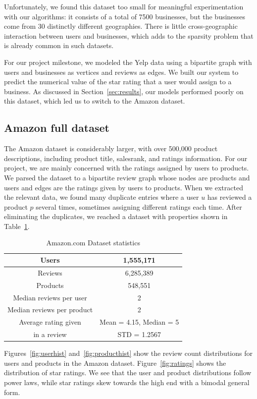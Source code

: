 \documentclass[letterpaper, 11 pt, conference]{ieeeconf}
\begin{document}
Unfortunately, we found this dataset too small for meaningful experimentation 
with our algorithms: it consists of a total of 7500 businesses, but the 
businesses come from 30 distinctly different geographies. There is little
cross-geographic interaction between users and businesses, which adds to the 
sparsity problem that is already common in such datasets. 

For our project milestone, we modeled the Yelp data using a bipartite graph 
with users and businesses as vertices and reviews as edges.
We built our system to predict the numerical value of the star
rating that a user would assign to a business. As discussed in 
Section~\ref{sec:results}, our models performed poorly on this dataset, which 
led us to switch to the Amazon dataset.

\subsection{Amazon full dataset}
The Amazon dataset is considerably larger, with over 
500,000 product descriptions, including product title, salesrank, and ratings 
information. For our project, we are mainly concerned with the ratings assigned 
by users to products. We parsed the dataset to a bipartite review 
graph whose nodes are products and users and edges are the ratings given by 
users to products. When we extracted the relevant data, we found many 
duplicate entries where a user $u$ has reviewed a product $p$ several times, 
sometimes assigning different ratings each time. After eliminating the 
duplicates, we reached a dataset with properties shown in 
Table~\ref{table:amazonstats}.

\begin{table}[htb]
\centering
\begin{tabular}{|c|c|}
\hline
Users &1,555,171 \tabularnewline \hline
Reviews &6,285,389 \tabularnewline \hline
Products &548,551 \tabularnewline \hline
Median reviews per user & 2
\tabularnewline \hline
Median reviews per product & 2
\tabularnewline \hline
Average rating given &Mean = 4.15, Median = 5 \tabularnewline
in a review &STD = 1.2567
\tabularnewline \hline

\end{tabular}
\caption{ Amazon.com Dataset statistics }
\label{table:amazonstats}
\end{table}

Figures~\ref{fig:userhist} and~\ref{fig:producthist} show the review count 
distributions for users and products in the Amazon dataset. 
Figure~\ref{fig:ratings} shows the distribution of star ratings. We see that 
the user and product distributions follow power laws, while star ratings skew 
towards the high end with a bimodal general form.
\end{document}

